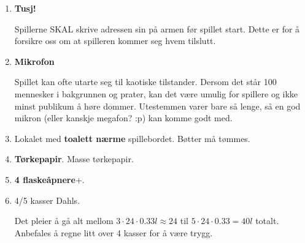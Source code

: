 \documentclass[10pt,a4paper,norsk,openany]{book}
\begin{document}
\begin{enumerate}
  \item \textbf{Tusj!}

    Spillerne SKAL skrive adressen sin på armen før spillet start. Dette er for å
    forsikre oss om at spilleren kommer seg hvem tilslutt.

  \item \textbf{Mikrofon}

    Spillet kan ofte utarte seg til kaotiske tilstander. Dersom det står 100
    mennesker i bakgrunnen og prater, kan det være umulig for spillere og ikke minst
    publikum å høre dommer. Utestemmen varer bare så lenge, så en god mikron (eller
    kanskje megafon? :p) kan komme godt med.

  \item Lokalet med \textbf{toalett nærme} spillebordet. Bøtter må tømmes.

  \item \textbf{Tørkepapir}. Masse tørkepapir.

  \item \textbf{4 flaskeåpnere}+.

  \item 4/5 kasser Dahls.

    Det pleier å gå alt mellom $3 \cdot 24 \cdot 0.33l \approx 24 $ til $5 \cdot 24
    \cdot 0.33 = 40l$ totalt. Anbefales å regne litt over 4 kasser for å være trygg.

\end{enumerate}

\begin{figure}
\end{figure}
\end{document}
